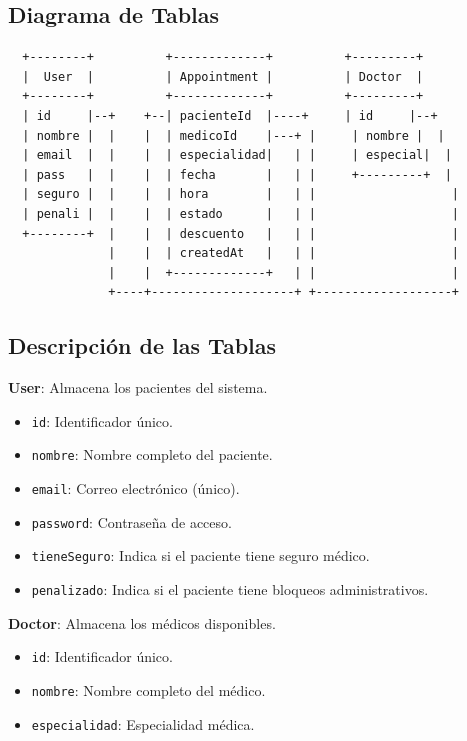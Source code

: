 \documentclass[12pt,a4paper]{article}
\begin{document}
\subsection{Diagrama de Tablas}
\begin{verbatim}
  +--------+          +-------------+          +---------+
  |  User  |          | Appointment |          | Doctor  |
  +--------+          +-------------+          +---------+
  | id     |--+    +--| pacienteId  |----+     | id     |--+
  | nombre |  |    |  | medicoId    |---+ |     | nombre |  |
  | email  |  |    |  | especialidad|   | |     | especial|  |
  | pass   |  |    |  | fecha       |   | |     +---------+  |
  | seguro |  |    |  | hora        |   | |                   |
  | penali |  |    |  | estado      |   | |                   |
  +--------+  |    |  | descuento   |   | |                   |
              |    |  | createdAt   |   | |                   |
              |    |  +-------------+   | |                   |
              +----+--------------------+ +-------------------+
\end{verbatim}

\subsection{Descripción de las Tablas}

\textbf{User}: Almacena los pacientes del sistema.
\begin{itemize}
    \item \texttt{id}: Identificador único.
    \item \texttt{nombre}: Nombre completo del paciente.
    \item \texttt{email}: Correo electrónico (único).
    \item \texttt{password}: Contraseña de acceso.
    \item \texttt{tieneSeguro}: Indica si el paciente tiene seguro médico.
    \item \texttt{penalizado}: Indica si el paciente tiene bloqueos administrativos.
\end{itemize}

\textbf{Doctor}: Almacena los médicos disponibles.
\begin{itemize}
    \item \texttt{id}: Identificador único.
    \item \texttt{nombre}: Nombre completo del médico.
    \item \texttt{especialidad}: Especialidad médica.
\end{itemize}
\end{document}
